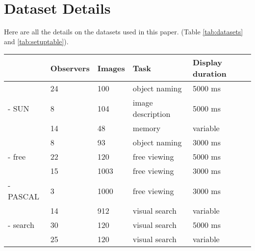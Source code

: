 \section{Dataset Details}

Here are all the details on the datasets used in this paper. (Table \ref{tab:datasets} and \ref{tab:setuptable}).


\begin{table*}
\centering
\small
\begin{tabular}{l|llll}
 & Observers & Images &  Task & Display duration\\
\hline
\cite{clarke2013}     & 24    & 100   & object naming        & 5000 ms\\
\cite{yun2013} - SUN        & 8     & 104   & image description    & 5000 ms\\
\cite{tatler2005}     & 14    & 48     & memory & variable\\
\cite{einhauser2008} & 8    & 93      & object naming & 3000 ms \\
\hline
\cite{tatler2007} - free    & 22    & 120   & free viewing          & 5000 ms\\
\cite{judd2009}         & 15 & 1003      & free viewing & 3000 ms\\
\cite{yun2013} - PASCAL        & 3 & 1000  & free viewing & 3000 ms\\
\hline
\cite{ehinger2009}     & 14 & 912 &  visual search & variable\\
\cite{tatler2007} - search    & 30 & 120 &   visual search & 5000 ms\\
\cite{asher2013}    & 25    & 120      & visual search & variable\\
\end{tabular}

\caption{Summary of the 10 datasets used throughout this study.}
\label{tab:datasets}
\end{table*}

